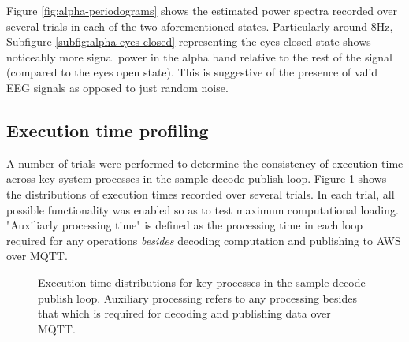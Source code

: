 Figure \ref{fig:alpha-periodograms} shows the estimated power spectra recorded over several trials in each of the two aforementioned states. Particularly around 8Hz, Subfigure \ref{subfig:alpha-eyes-closed} representing the eyes closed state shows noticeably more signal power in the alpha band relative to the rest of the signal (compared to the eyes open state). This is suggestive of the presence of valid EEG signals as opposed to just random noise.

\subsection{Execution time profiling}
A number of trials were performed to determine the consistency of execution time across key system processes in the sample-decode-publish loop. Figure \ref{fig:timing-distributions} shows the distributions of execution times recorded over several trials. In each trial, all possible functionality was enabled so as to test maximum computational loading. "Auxiliarly processing time" is defined as the processing time in each loop required for any operations \textit{besides} decoding computation and publishing to AWS over MQTT. 

\begin{figure}[htp]
\centering
{}
\hfill
{}
\hfill 
{}
\caption[Execution time distributions for key processes in the sample-decode-publish loop.]{Execution time distributions for key processes in the sample-decode-publish loop. Auxiliary processing refers to any processing besides that which is required for decoding and publishing data over MQTT.}
\label{fig:timing-distributions}
\end{figure}


